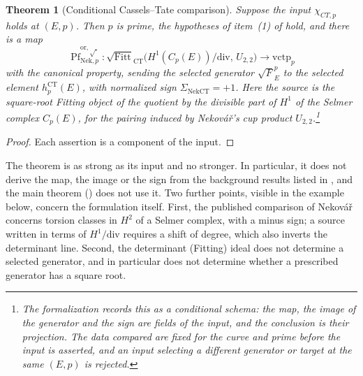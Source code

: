 \documentclass[11pt]{article}
\newtheorem{theorem}{Theorem}[section]
\theoremstyle{definition}
\newcommand{\Pf}{\operatorname{Pf}}
\newcommand{\Fitt}{\operatorname{Fitt}}
\newcommand{\chiCTp}{\chi_{CT,p}}                       \newcommand{\AofE}{\mathcal{A}_E}                        \newcommand{\etap}{\eta_p}                              \newcommand{\RefStable}{\mathbf{RefStable\,AOR}}
\begin{document}
\begin{theorem}[Conditional Cassels--Tate comparison]\label{thm:closure:chi-ct-p-comparison}
Suppose the input $\chiCTp$ holds at $(E,p)$.  Then $p$ is prime, the
hypotheses of item~(1) of  hold, and
there is a map
\[
  \Pf_{\mathrm{Nek},p}^{\mathrm{or},\sqrt{\ }}:
  \sqrt{\Fitt}_{\mathrm{CT}}
    \bigl(H^1(C_p(E))/\mathrm{div},\,U_{2,2}\bigr)
  \longrightarrow
  \mathrm{vctp}_p
\]
with the canonical property, sending the selected generator
$\sqrt{F}_E^p$ to the selected element
$h_p^{\mathrm{CT}}(E)$, with normalized sign
$\Sigma_{\mathrm{NekCT}}=+1$.  Here the source is the square-root Fitting
object of the quotient by the divisible part of $H^1$ of the Selmer
complex $C_p(E)$, for the pairing induced by Nekov\'a\v{r}'s cup product
$U_{2,2}$.\footnote{The formalization records this as a conditional schema: the
map, the image of the generator and the sign are fields of the input, and
the conclusion is their projection.  The data compared are fixed for the
curve and prime before the input is asserted, and an input selecting a
different generator or target at the same $(E,p)$ is rejected.}
\end{theorem}

\begin{proof}
Each assertion is a component of the input.
\end{proof}

The theorem is as strong as its input and no stronger.  In particular, it
does not derive the map, the image or the sign from the background results
listed in , and the main theorem
() does not use it.  Two further
points, visible in the example below, concern the formulation itself.
First, the published comparison of Nekov\'a\v{r} concerns torsion classes
in $H^2$ of a Selmer complex, with a minus sign; a source written in terms
of $H^1/\mathrm{div}$ requires a shift of degree, which also inverts the
determinant line.  Second, the determinant (Fitting) ideal does not
determine a selected generator, and in particular does not determine
whether a prescribed generator has a square root.
\end{document}
